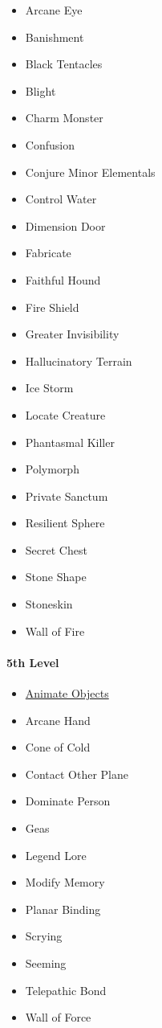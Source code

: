 \begin{itemize}
\item
  Arcane Eye
\item
  Banishment
\item
  Black Tentacles
\item
  Blight
\item
  Charm Monster
\item
  Confusion
\item
  Conjure Minor Elementals
\item
  Control Water
\item
  Dimension Door
\item
  Fabricate
\item
  Faithful Hound
\item
  Fire Shield
\item
  Greater Invisibility
\item
  Hallucinatory Terrain
\item
  Ice Storm
\item
  Locate Creature
\item
  Phantasmal Killer
\item
  Polymorph
\item
  Private Sanctum
\item
  Resilient Sphere
\item
  Secret Chest
\item
  Stone Shape
\item
  Stoneskin
\item
  Wall of Fire
\end{itemize}

\paragraph{5th Level}\label{_5th_level_3}

\begin{itemize}
\item
  \hyperref[spell-animate-objects]{Animate Objects}
\item
  Arcane Hand
\item
  Cone of Cold
\item
  Contact Other Plane
\item
  Dominate Person
\item
  Geas
\item
  Legend Lore
\item
  Modify Memory
\item
  Planar Binding
\item
  Scrying
\item
  Seeming
\item
  Telepathic Bond
\item
  Wall of Force
\end{itemize}

